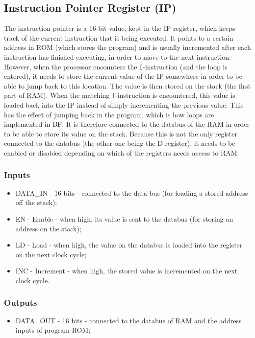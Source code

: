 \subsection{Instruction Pointer Register (IP)} \label{sec:architecture:ip}
The instruction pointer is a 16-bit value, kept in the IP register, which keeps track of the current instruction that is being executed. It points to a certain address in ROM (which stores the program) and is usually incremented after each instruction has finished executing, in order to move to the next instruction. However, when the processor encounters the \texttt{[}-instruction (and the loop is entered), it needs to store the current value of the IP somewhere in order to be able to jump back to this location. The value is then stored on the stack (the first part of RAM). When the matching \texttt{]}-instruction is encountered, this value is loaded back into the IP instead of simply incrementing the previous value. This has the effect of jumping back in the program, which is how loops are implemented in BF. It is therefore connected to the databus of the RAM in order to be able to store its value on the stack. Because this is not the only register connected to the databus (the other one being the D-register), it needs to be enabled or disabled depending on which of the registers needs access to RAM.

\subsubsection*{Inputs}
\begin{itemize}
\itemsep0em 
\item DATA\_IN - 16 bits - connected to the data bus (for loading a stored address off the stack);
\item EN - Enable - when high, its value is sent to the databus (for storing an address on the stack);
\item LD - Load - when high, the value on the databus is loaded into the register on the next clock cycle;
\item INC - Increment - when high, the stored value is incremented on the next clock cycle.
\end{itemize}

\subsubsection*{Outputs}
\begin{itemize}
\itemsep0em 
\item DATA\_OUT - 16 bits - connected to the databus of RAM and the address inputs of program-ROM;
\end{itemize}


